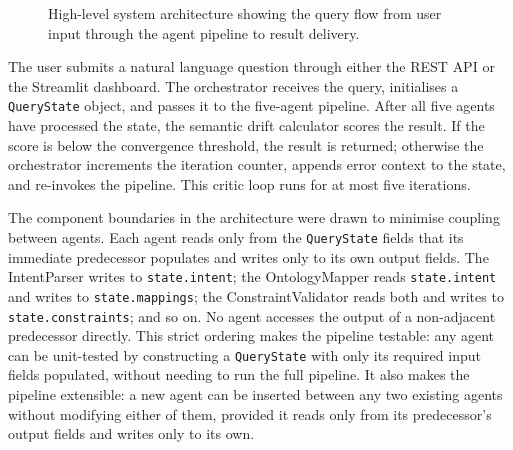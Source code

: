 \documentclass[12pt,a4paper]{report}
\begin{document}
\begin{figure}[H]
  \centering
  \caption{High-level system architecture showing the query flow from user input through the agent pipeline to result delivery.}
  \label{fig:architecture}
\end{figure}

The user submits a natural language question through either the \ac{REST} \ac{API} or the Streamlit dashboard. The orchestrator receives the query, initialises a \texttt{QueryState} object, and passes it to the five-agent pipeline. After all five agents have processed the state, the semantic drift calculator scores the result. If the score is below the convergence threshold, the result is returned; otherwise the orchestrator increments the iteration counter, appends error context to the state, and re-invokes the pipeline. This critic loop runs for at most five iterations.

The component boundaries in the architecture were drawn to minimise coupling between agents. Each agent reads only from the \texttt{QueryState} fields that its immediate predecessor populates and writes only to its own output fields. The IntentParser writes to \texttt{state.intent}; the OntologyMapper reads \texttt{state.intent} and writes to \texttt{state.mappings}; the ConstraintValidator reads both and writes to \texttt{state.constraints}; and so on. No agent accesses the output of a non-adjacent predecessor directly. This strict ordering makes the pipeline testable: any agent can be unit-tested by constructing a \texttt{QueryState} with only its required input fields populated, without needing to run the full pipeline. It also makes the pipeline extensible: a new agent can be inserted between any two existing agents without modifying either of them, provided it reads only from its predecessor's output fields and writes only to its own.
\end{document}
